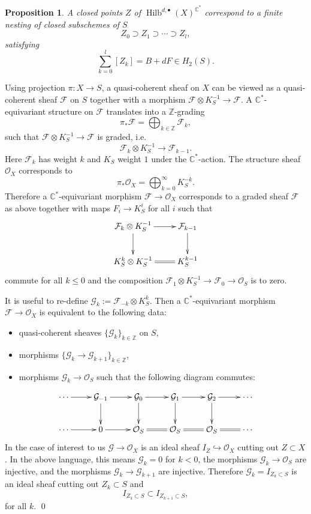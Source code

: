 \documentclass{amsart}
\newtheorem{proposition}[theorem]{Proposition}
\theoremstyle{definition}
\newcommand{\CC} {\mathbb{C}}          %
\newcommand{\ZZ} {\mathbb{Z}}		%
\renewcommand{\O}{\mathcal{O}}
\newcommand{\Hilb}{\operatorname{Hilb}}
\newcommand{\F}{\mathcal{F}}
\newcommand{\G}{\mathcal{G}}
\begin{document}
\begin{proposition} \label{nest}
A closed points $Z$ of $\Hilb^{d,\bullet}(X)^{\CC^*}$ correspond to a
finite nesting of closed subschemes of $S$
$$
Z_{0} \supset Z_{1} \supset \cdots \supset Z_{l},
$$
satisfying
$$
\sum_{k=0}^{l} [Z_k] = B + dF \in H_2(S).
$$
\end{proposition}

\proof 
Using projection $\pi : X \rightarrow S$, a quasi-coherent sheaf on
$X$ can be viewed as a quasi-coherent sheaf $\F$ on $S$ together with
a morphism $\F \otimes K_{S}^{-1} \rightarrow \F$. A
$\CC^*$-equivariant structure on $\F$ translates into a $\ZZ$-grading
$$
\pi_* \F = \bigoplus_{k \in \ZZ} \F_k,
$$
such that $\F \otimes K_{S}^{-1} \rightarrow \F$ is graded, i.e.
$$
\F_k \otimes K_{S}^{-1} \longrightarrow \F_{k-1}.
$$
Here $\F_k$ has weight $k$ and $K_{S}$ weight $1$ under the $\CC^*$-action. The structure sheaf $\O_X$ corresponds to 
$$
\pi_* \O_X = \bigoplus_{k=0}^{\infty} K_{S}^{-k}.
$$
Therefore a $\CC^*$-equivariant morphism $\F \rightarrow \O_X$
corresponds to a graded sheaf $\F$ as above together with maps
$F_{i}\to K_{S}^{i}$ for all $i$ such that
\begin{displaymath}
\xymatrix
{
\F_k \otimes K_{S}^{-1} \ar[r] \ar[d] & \F_{k-1} \ar[d] \\
K_{S}^{k} \otimes K_{S}^{-1} \ar@{=}[r] & K_{S}^{k-1}
}
\end{displaymath}
commute for all $k\leq 0$ and the composition $\F_1 \otimes K_{S}^{-1} \rightarrow \F_0 \rightarrow \O_S$ is to zero. 

It is useful to re-define $\G_k := \F_{-k} \otimes K_{S}^{k}$. Then a $\CC^*$-equivariant morphism $\F \rightarrow \O_X$ is equivalent to the following data:
\begin{itemize}
\item quasi-coherent sheaves $\{\G_k\}_{k \in \ZZ}$ on $S$,
\item morphisms $\{\G_k \rightarrow \G_{k+1}\}_{k \in \ZZ}$,
\item morphisms $\G_k \rightarrow \O_S$ such that the following diagram commutes:
\end{itemize}
\begin{displaymath}
\xymatrix
{
\cdots \ar[r] & \G_{-1} \ar[d] \ar[r] & \G_0 \ar[r] \ar[d] & \G_{1} \ar[r] \ar[d] & \G_{2} \ar[r] \ar[d] & \cdots \\
\cdots \ar[r] & 0 \ar[r] & \O_S \ar@{=}[r]& \O_S \ar@{=}[r] & \O_S \ar@{=}[r] & \cdots 
}
\end{displaymath}
In the case of interest to us $\G \rightarrow \O_X$ is an ideal sheaf $I_Z \hookrightarrow \O_X$ cutting out $Z \subset X$. In the above language, this means $\G_k = 0$ for $k<0$, the morphisms $\G_k \rightarrow \O_S$ are injective, and the morphisms $\G_k \rightarrow \G_{k+1}$ are injective. Therefore $\G_k = I_{Z_k \subset S}$ is an ideal sheaf cutting out $Z_k \subset S$ and 
$$
I_{Z_k \subset S} \subset I_{Z_{k+1} \subset S},
$$
for all $k$. \qed 
\end{document}
